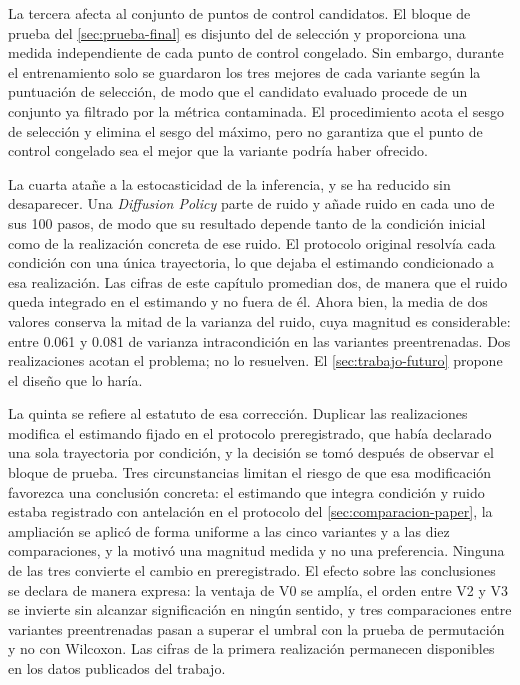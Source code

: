 La tercera afecta al conjunto de puntos de control candidatos. El bloque de prueba del
\cref{sec:prueba-final} es disjunto del de selecci\'on y proporciona una medida
independiente de cada punto de control congelado. Sin embargo, durante el entrenamiento
solo se guardaron los tres mejores de cada variante seg\'un la puntuaci\'on de selecci\'on,
de modo que el candidato evaluado procede de un conjunto ya filtrado por la m\'etrica
contaminada. El procedimiento acota el sesgo de selecci\'on y elimina el sesgo del
m\'aximo, pero no garantiza que el punto de control congelado sea el mejor que la variante
podr\'ia haber ofrecido.

La cuarta ata\~ne a la estocasticidad de la inferencia, y se ha reducido sin desaparecer.
Una \textit{Diffusion Policy} parte de ruido y a\~nade ruido en cada uno de sus \num{100}
pasos, de modo que su resultado depende tanto de la condici\'on inicial como de la
realizaci\'on concreta de ese ruido. El protocolo original resolv\'ia cada condici\'on con
una \'unica trayectoria, lo que dejaba el estimando condicionado a esa realizaci\'on. Las
cifras de este cap\'itulo promedian dos, de manera que el ruido queda integrado en el
estimando y no fuera de \'el. Ahora bien, la media de dos valores conserva la mitad de la
varianza del ruido, cuya magnitud es considerable: entre \num{0.061} y \num{0.081} de
varianza intracondici\'on en las variantes preentrenadas. Dos realizaciones acotan el
problema; no lo resuelven. El \cref{sec:trabajo-futuro} propone el dise\~no que lo har\'ia.

La quinta se refiere al estatuto de esa correcci\'on. Duplicar las realizaciones modifica el
estimando fijado en el protocolo preregistrado, que hab\'ia declarado una sola trayectoria
por condici\'on, y la decisi\'on se tom\'o despu\'es de observar el bloque de prueba. Tres
circunstancias limitan el riesgo de que esa modificaci\'on favorezca una conclusi\'on
concreta: el estimando que integra condici\'on y ruido estaba registrado con antelaci\'on en
el protocolo del \cref{sec:comparacion-paper}, la ampliaci\'on se aplic\'o de forma uniforme
a las cinco variantes y a las diez comparaciones, y la motiv\'o una magnitud medida y no una
preferencia. Ninguna de las tres convierte el cambio en preregistrado. El efecto sobre las
conclusiones se declara de manera expresa: la ventaja de V0 se ampl\'ia, el orden entre V2 y
V3 se invierte sin alcanzar significaci\'on en ning\'un sentido, y tres comparaciones entre
variantes preentrenadas pasan a superar el umbral con la prueba de permutaci\'on y no con
Wilcoxon. Las cifras de la primera realizaci\'on permanecen disponibles en los datos
publicados del trabajo.

